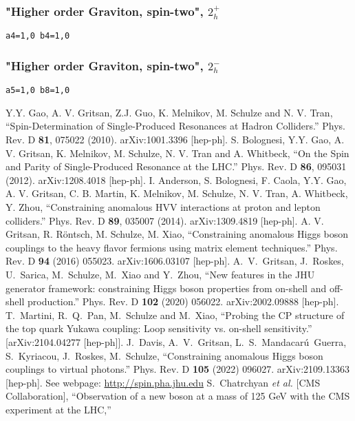 \documentclass[aps,superscriptaddress,nofootinbib]{revtex4}
\begin{document}
\subsubsection{"Higher order Graviton, spin-two", \texorpdfstring{$2^+_h$}{2+h}}
\verb|a4=1,0 b4=1,0|
\subsubsection{"Higher order Graviton, spin-two", \texorpdfstring{$2^-_h$}{2-h}}
\verb|a5=1,0 b8=1,0|
\begin{thebibliography}{99}
Y.Y. Gao, A. V. Gritsan, Z.J. Guo, K. Melnikov, M. Schulze and N. V. Tran, ``Spin-Determination of Single-Produced Resonances at Hadron Colliders.'' Phys. Rev. D \textbf{81}, 075022 (2010). arXiv:1001.3396 [hep-ph].
S. Bolognesi, Y.Y. Gao, A. V. Gritsan, K. Melnikov, M. Schulze, N. V. Tran and A. Whitbeck, ``On the Spin and Parity of Single-Produced Resonance at the LHC.'' Phys. Rev. D \textbf{86}, 095031 (2012). arXiv:1208.4018 [hep-ph].
I. Anderson, S. Bolognesi, F. Caola, Y.Y. Gao, A. V. Gritsan, C. B. Martin, K. Melnikov, M. Schulze, N. V. Tran, A. Whitbeck, Y. Zhou, ``Constraining anomalous HVV interactions at proton and lepton colliders.'' Phys. Rev. D \textbf{89}, 035007 (2014). arXiv:1309.4819 [hep-ph].
A. V. Gritsan, R. R\"ontsch, M. Schulze, M. Xiao, ``Constraining anomalous Higgs boson couplings to the heavy flavor fermions using matrix element techniques.'' Phys. Rev. D \textbf{94} (2016) 055023. arXiv:1606.03107 [hep-ph].
 A.~V.~Gritsan, J.~Roskes, U.~Sarica, M.~Schulze, M.~Xiao and Y.~Zhou, ``New features in the JHU generator framework: 
 constraining Higgs boson properties from on-shell and off-shell production.'' 
 Phys. Rev. D \textbf{102} (2020) 056022. arXiv:2002.09888 [hep-ph].
T.~Martini, R.~Q.~Pan, M.~Schulze and M.~Xiao,
``Probing the CP structure of the top quark Yukawa coupling: Loop sensitivity vs. on-shell sensitivity.''
[arXiv:2104.04277 [hep-ph]].
J.~Davis, A.~V.~Gritsan, L.~S.~Mandacar\'{u}~Guerra, S.~Kyriacou, J.~Roskes, M.~Schulze, ``Constraining anomalous Higgs boson couplings to virtual photons.'' 
 Phys. Rev. D \textbf{105} (2022) 096027. arXiv:2109.13363 [hep-ph].
See webpage: \url{http://spin.pha.jhu.edu}
  S.~Chatrchyan {\it et al.}  [CMS Collaboration],
  ``Observation of a new boson at a mass of 125 GeV with the CMS experiment at the LHC,''

\end{thebibliography}
\end{document}
